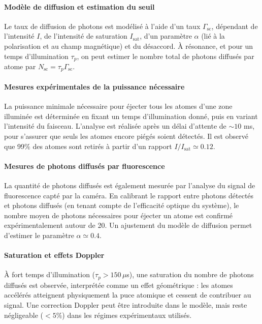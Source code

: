 \paragraph{Modèle de diffusion et estimation du seuil}

Le taux de diffusion de photons est modélisé à l’aide d’un taux \(\Gamma_{\mathrm{sc}}\), dépendant de l’intensité \(I\), de l’intensité de saturation \(I_{\mathrm{sat}}\), d’un paramètre \(\alpha\) (lié à la polarisation et au champ magnétique) et du désaccord. À résonance, et pour un temps d’illumination \(\tau_p\), on peut estimer le nombre total de photons diffusés par atome par \(N_{\mathrm{sc}} = \tau_p \Gamma_{\mathrm{sc}}\).

\paragraph{Mesures expérimentales de la puissance nécessaire}

La puissance minimale nécessaire pour éjecter tous les atomes d’une zone illuminée est déterminée en fixant un temps d’illumination donné, puis en variant l’intensité du faisceau. L’analyse est réalisée après un délai d’attente de \(\sim 10\) ms, pour s’assurer que seuls les atomes encore piégés soient détectés. Il est observé que 99$\%$ des atomes sont retirés à partir d’un rapport \(I/I_{\mathrm{sat}} \simeq 0.12\).

\paragraph{Mesures de photons diffusés par fluorescence}

La quantité de photons diffusés est également mesurée par l’analyse du signal de fluorescence capté par la caméra. En calibrant le rapport entre photons détectés et photons diffusés (en tenant compte de l’efficacité optique du système), le nombre moyen de photons nécessaires pour éjecter un atome est confirmé expérimentalement autour de 20. Un ajustement du modèle de diffusion permet d’estimer le paramètre \(\alpha \simeq 0.4\).

\paragraph{Saturation et effets Doppler}

À fort temps d’illumination (\(\tau_p > 150\,\mu\)s), une saturation du nombre de photons diffusés est observée, interprétée comme un effet géométrique : les atomes accélérés atteignent physiquement la puce atomique et cessent de contribuer au signal. Une correction Doppler peut être introduite dans le modèle, mais reste négligeable (\(< 5\%\)) dans les régimes expérimentaux utilisés.

